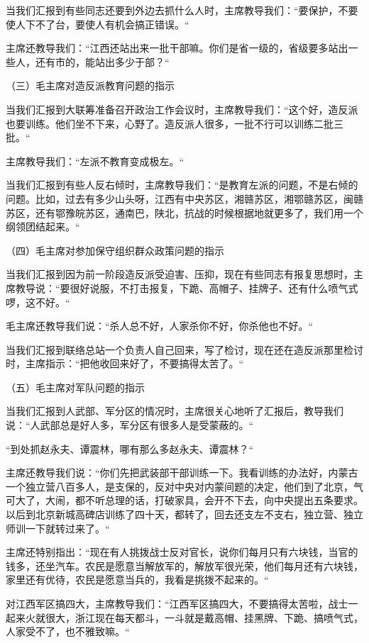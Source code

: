 当我们汇报到有些同志还要到外边去抓什么人时，主席教导我们：“要保护，不要使人下不了台，要使人有机会搞正错误。“

主席还教导我们：“江西还站出来一批干部嘛。你们是省一级的，省级要多站出一些人，还有市的，能站出多少于部？“

（三）毛主席对造反派教育问题的指示

当我们汇报到大联筹准备召开政治工作会议时，主席教导我们：“这个好，造反派也要训练。他们坐不下来，心野了。造反派人很多，一批不行可以训练二批三批。“

主席教导我们：“左派不教育变成极左。“

当我们汇报到有些人反右倾时，主席教导我们：“是教育左派的问题，不是右倾的问题。比如，过去有多少山头呀，江西有中央苏区，湘赣苏区，湘鄂赣苏区，闽赣苏区，还有鄂豫皖苏区，通南巴，陕北，抗战的时候根据地就更多了，我们用一个纲领团结起来。“

（四）毛主席对参加保守组织群众政策问题的指示

当我们汇报到因为前一阶段造反派受迫害、压抑，现在有些同志有报复思想时，主席教导说：“要很好说服，不打击报复，下跪、高帽子、挂牌子、还有什么喷气式啰，这不好。“

毛主席还教导我们说：“杀人总不好，人家杀你不好，你杀他也不好。“

当我们汇报到联络总站一个负责人自己回来，写了检讨，现在还在造反派那里检讨时，主席指示：“把他收回来好了，不要搞得太苦了。“

（五）毛主席对军队问题的指示

当我们汇报到人武部、军分区的情况时，主席很关心地听了汇报后，教导我们说：“人武部总是好人多，军分区有很多人是受蒙蔽的。“

“到处抓赵永夫、谭震林，哪有那么多赵永夫、谭震林？“

主席还教导我们说：“你们先把武装部干部训练一下。我看训练的办法好，内蒙古一个独立营八百多人，是支保的，反对中央对内蒙间题的决定，他们到了北京，气可大了，大闹，都不听总理的话，打破家具，会开不下去，向中央提出五条要求。以后到北京新城高碑店训练了四十天，都转了，回去还支左不支右，独立营、独立师训一下就转过来了。“

主席还特别指出：“现在有人挑拨战士反对官长，说你们每月只有六块钱，当官的钱多，还坐汽车。农民是愿意当解放军的，解放军很光荣，他们每月还有六块钱，家里还有优待，农民是愿意当兵的，我看是挑拨不起来的。“

对江西军区搞四大，主席教导我们：“江西军区搞四大，不要搞得太苦啦，战士一起来火就很大，浙江现在每天都斗，一斗就是戴高帽、挂黑牌、下跪、搞喷气式，人家受不了，也不雅致嘛。“


